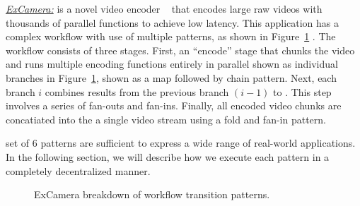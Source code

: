 	\noindent\underline{\textit{ExCamera:}} is a novel video encoder ~\cite{excamera} that
	encodes large raw videos with thousands of parallel functions to achieve
	low latency. This application has a complex workflow with use of multiple patterns, as shown in Figure~\ref{fig:excamera} .
	The workflow consists of three
	stages. First, an ``encode'' stage  that chunks the video and runs multiple encoding functions entirely in parallel shown as individual branches in Figure~\ref{fig:excamera}, shown as a map followed by chain pattern. Next, each branch $i$ combines results from the previous branch $(i-1)$ to 
	. This step involves a series of fan-outs and fan-ins. Finally, all encoded video chunks are concatiated into the a single video stream using a fold and fan-in pattern.
%	

  set of 6 patterns are sufficient to express a wide range of real-world applications. In the following section, we will describe  how we execute each pattern in a completely decentralized manner.

\begin{figure}[t!]
	\centering
	\caption{ExCamera breakdown of workflow transition patterns. }
	\label{fig:excamera}
\end{figure}


